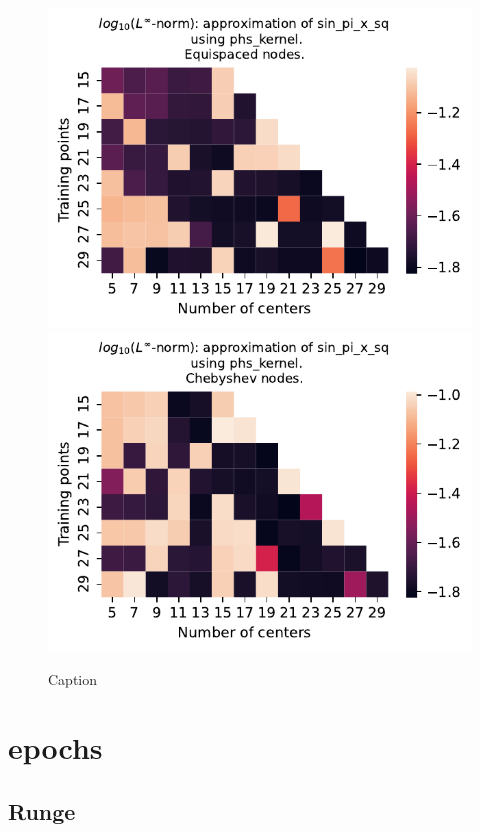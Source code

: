 \documentclass[12pt]{report} %
\begin{document}
\begin{figure}[ht]
    \centering
    
    \includegraphics[width=.49\textwidth]{imagenes/experiments/1d/variational/sin_pi_x_sq-Kphs_kernel-Equi.pdf}
    \includegraphics[width=.49\textwidth]{imagenes/experiments/1d/variational/sin_pi_x_sq-Kphs_kernel-Cheb.pdf}
    \caption{Caption}
    \label{fig:sin-pi-x-sq-phs}
\end{figure}

\section*{epochs}

\subsection*{Runge}
\end{document}
